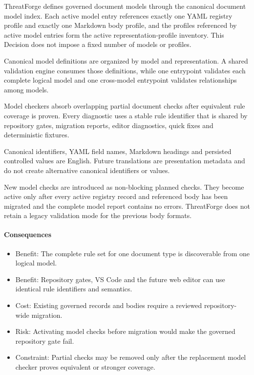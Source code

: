 \documentclass[
  10pt,
]{article}
\providecommand{\tightlist}{%
  \setlength{\itemsep}{0pt}\setlength{\parskip}{0pt}}
\begin{document}
ThreatForge defines governed document models through the canonical
document model index. Each active model entry references exactly one
YAML registry profile and exactly one Markdown body profile, and the
profiles referenced by active model entries form the active
representation-profile inventory. This Decision does not impose a fixed
number of models or profiles.

Canonical model definitions are organized by model and representation. A
shared validation engine consumes those definitions, while one
entrypoint validates each complete logical model and one cross-model
entrypoint validates relationships among models.

Model checkers absorb overlapping partial document checks after
equivalent rule coverage is proven. Every diagnostic uses a stable rule
identifier that is shared by repository gates, migration reports, editor
diagnostics, quick fixes and deterministic fixtures.

Canonical identifiers, YAML field names, Markdown headings and persisted
controlled values are English. Future translations are presentation
metadata and do not create alternative canonical identifiers or values.

New model checks are introduced as non-blocking planned checks. They
become active only after every active registry record and referenced
body has been migrated and the complete model report contains no errors.
ThreatForge does not retain a legacy validation mode for the previous
body formats.

\paragraph{Consequences}\label{consequences-10}

\begin{itemize}
\tightlist
\item
  Benefit: The complete rule set for one document type is discoverable
  from one logical model.
\item
  Benefit: Repository gates, VS Code and the future web editor can use
  identical rule identifiers and semantics.
\item
  Cost: Existing governed records and bodies require a reviewed
  repository-wide migration.
\item
  Risk: Activating model checks before migration would make the governed
  repository gate fail.
\item
  Constraint: Partial checks may be removed only after the replacement
  model checker proves equivalent or stronger coverage.
\end{itemize}
\end{document}
